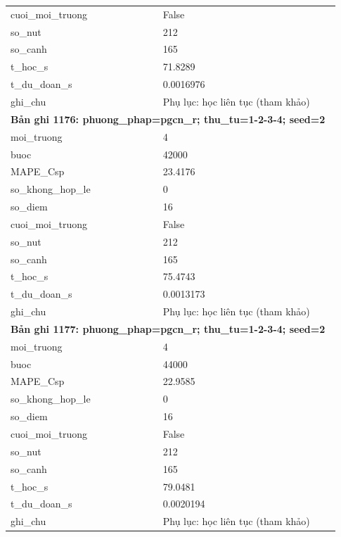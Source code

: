 \begin{longtable}{p{0.43\linewidth}p{0.50\linewidth}}
cuoi\_\allowbreak moi\_\allowbreak truong & False \\
so\_\allowbreak nut & 212 \\
so\_\allowbreak canh & 165 \\
t\_\allowbreak hoc\_\allowbreak s & 71.8289 \\
t\_\allowbreak du\_\allowbreak doan\_\allowbreak s & 0.0016976 \\
ghi\_\allowbreak chu & Phụ lục: học liên tục (tham khảo) \\
\midrule
\multicolumn{2}{p{0.95\linewidth}}{\textbf{Bản ghi 1176: phuong\_phap=pgcn\_r; thu\_tu=1-2-3-4; seed=2}} \\
moi\_\allowbreak truong & 4 \\
buoc & 42000 \\
MAPE\_\allowbreak Csp & 23.4176 \\
so\_\allowbreak khong\_\allowbreak hop\_\allowbreak le & 0 \\
so\_\allowbreak diem & 16 \\
cuoi\_\allowbreak moi\_\allowbreak truong & False \\
so\_\allowbreak nut & 212 \\
so\_\allowbreak canh & 165 \\
t\_\allowbreak hoc\_\allowbreak s & 75.4743 \\
t\_\allowbreak du\_\allowbreak doan\_\allowbreak s & 0.0013173 \\
ghi\_\allowbreak chu & Phụ lục: học liên tục (tham khảo) \\
\midrule
\multicolumn{2}{p{0.95\linewidth}}{\textbf{Bản ghi 1177: phuong\_phap=pgcn\_r; thu\_tu=1-2-3-4; seed=2}} \\
moi\_\allowbreak truong & 4 \\
buoc & 44000 \\
MAPE\_\allowbreak Csp & 22.9585 \\
so\_\allowbreak khong\_\allowbreak hop\_\allowbreak le & 0 \\
so\_\allowbreak diem & 16 \\
cuoi\_\allowbreak moi\_\allowbreak truong & False \\
so\_\allowbreak nut & 212 \\
so\_\allowbreak canh & 165 \\
t\_\allowbreak hoc\_\allowbreak s & 79.0481 \\
t\_\allowbreak du\_\allowbreak doan\_\allowbreak s & 0.0020194 \\
ghi\_\allowbreak chu & Phụ lục: học liên tục (tham khảo) \\

\end{longtable}
